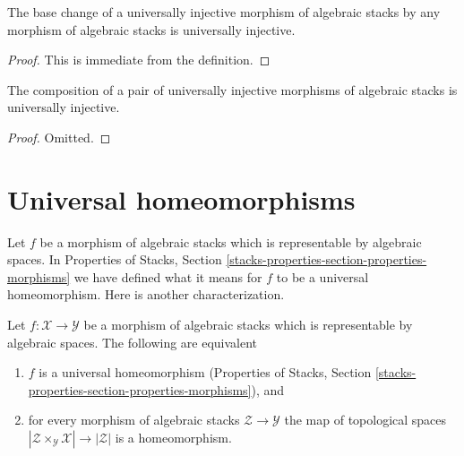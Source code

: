 \begin{lemma}
\label{lemma-base-change-universally-injective}
The base change of a universally injective morphism of algebraic stacks
by any morphism of algebraic stacks is universally injective.
\end{lemma}

\begin{proof}
This is immediate from the definition.
\end{proof}

\begin{lemma}
\label{lemma-composition-universally-injective}
The composition of a pair of universally injective morphisms of
algebraic stacks is universally injective.
\end{lemma}

\begin{proof}
Omitted.
\end{proof}










\section{Universal homeomorphisms}
\label{section-universal-homeomorphisms}

\noindent
Let $f$ be a morphism of algebraic stacks which is representable by
algebraic spaces. In
Properties of Stacks, Section
\ref{stacks-properties-section-properties-morphisms}
we have defined what it means for $f$ to be a universal homeomorphism.
Here is another characterization.

\begin{lemma}
\label{lemma-characterize-representable-universal-homeomorphism}
Let $f : \mathcal{X} \to \mathcal{Y}$ be a morphism of
algebraic stacks which is representable by algebraic spaces.
The following are equivalent
\begin{enumerate}
\item $f$ is a universal homeomorphism (Properties of Stacks,
Section \ref{stacks-properties-section-properties-morphisms}), and
\item for every morphism of algebraic stacks $\mathcal{Z} \to \mathcal{Y}$
the map of topological spaces
$|\mathcal{Z} \times_\mathcal{Y} \mathcal{X}| \to |\mathcal{Z}|$ is
a homeomorphism.
\end{enumerate}
\end{lemma}

